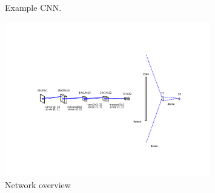 \begin{figure}[htbp]
{\begin{tikzpicture}

%

	\end{tikzpicture}
	}
	\caption{Example CNN.}
	\label{fig:network-concept}
\end{figure}

\begin{figure}
	\includegraphics[width=0.8\textwidth]{../../net/images/network}
	\caption{Network overview}
	\label{fig:network-structure}
\end{figure}

